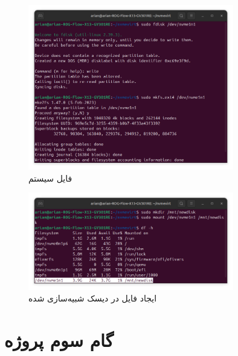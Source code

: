 \documentclass[12pt]{article}
\begin{document}
\begin{figure}[H]
    \centering
    \includegraphics[width=0.8\textwidth]{5.png}
    \caption{فایل سیستم}
\end{figure}

\begin{figure}[H]
    \centering
    \includegraphics[width=0.8\textwidth]{6.png}
    \caption{ایجاد فایل در دیسک‌ شبیه‌سازی شده}
\end{figure}

\newpage
\section*{گام سوم پروژه}
\end{document}
